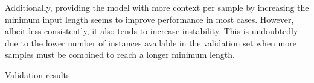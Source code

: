 \documentclass[12pt]{report}
\begin{document}
Additionally, providing the model with more context per sample by increasing the minimum input length seems to improve performance in most cases.
However, albeit less consistently, it also tends to increase instability.
This is undoubtedly due to the lower number of instances available in the validation set when more samples must be combined to reach a longer minimum length.
\begin{table}
\begin{adjustbox}{width=1\textwidth}
    
\end{adjustbox}
\caption{Validation results}
\label{tab: val results}
\end{table}

\end{document}
